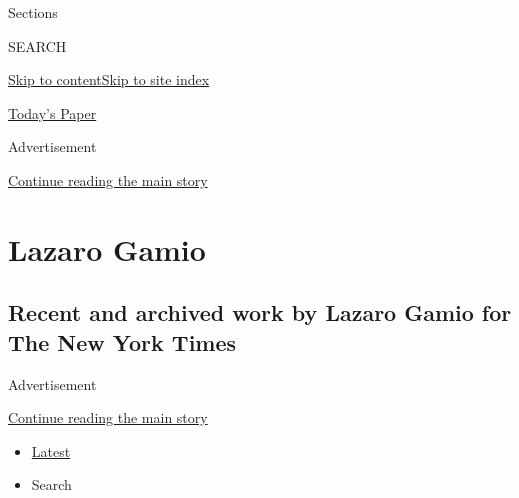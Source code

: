 Sections

SEARCH

\protect\hyperlink{site-content}{Skip to
content}\protect\hyperlink{site-index}{Skip to site index}

\href{https://myaccount.nytimes.com/auth/login?response_type=cookie\&client_id=vi}{}

\href{https://www.nytimes.com/section/todayspaper}{Today's Paper}

Advertisement

\protect\hyperlink{after-top}{Continue reading the main story}

\hypertarget{lazaro-gamio}{%
\section{Lazaro Gamio}\label{lazaro-gamio}}

\hypertarget{recent-and-archived-work-by-lazaro-gamio-for-the-new-york-times}{%
\subsection{Recent and archived work by Lazaro Gamio for The New York
Times}\label{recent-and-archived-work-by-lazaro-gamio-for-the-new-york-times}}

Advertisement

\protect\hyperlink{after-mid1}{Continue reading the main story}

\begin{itemize}
\tightlist
\item
  \protect\hyperlink{stream-panel}{Latest}
\item
  Search
\end{itemize}

